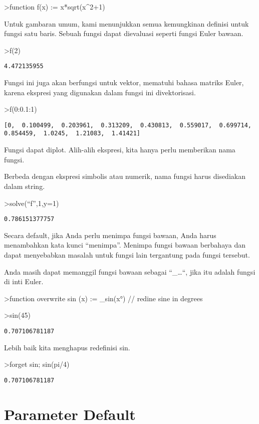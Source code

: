 \documentclass[
]{book}
\begin{document}
\textgreater function f(x) := x*sqrt(x\^{}2+1)

Untuk gambaran umum, kami menunjukkan semua kemungkinan definisi untuk fungsi satu baris. Sebuah fungsi dapat dievaluasi seperti fungsi Euler bawaan.

\textgreater f(2)

\begin{verbatim}
4.472135955
\end{verbatim}

Fungsi ini juga akan berfungsi untuk vektor, mematuhi bahasa matriks Euler, karena ekspresi yang digunakan dalam fungsi ini divektorisasi.

\textgreater f(0:0.1:1)

\begin{verbatim}
[0,  0.100499,  0.203961,  0.313209,  0.430813,  0.559017,  0.699714,
0.854459,  1.0245,  1.21083,  1.41421]
\end{verbatim}

Fungsi dapat diplot. Alih-alih ekspresi, kita hanya perlu memberikan nama fungsi.

Berbeda dengan ekspresi simbolis atau numerik, nama fungsi harus disediakan dalam string.

\textgreater solve(``f'',1,y=1)

\begin{verbatim}
0.786151377757
\end{verbatim}

Secara default, jika Anda perlu menimpa fungsi bawaan, Anda harus menambahkan kata kunci ``menimpa''. Menimpa fungsi bawaan berbahaya dan dapat menyebabkan masalah untuk fungsi lain tergantung pada fungsi tersebut.

Anda masih dapat memanggil fungsi bawaan sebagai ``\_\ldots``, jika itu adalah fungsi di inti Euler.

\textgreater function overwrite sin (x) := \_sin(x°) // redine sine in degrees

\textgreater sin(45)

\begin{verbatim}
0.707106781187
\end{verbatim}

Lebih baik kita menghapus redefinisi sin.

\textgreater forget sin; sin(pi/4)

\begin{verbatim}
0.707106781187
\end{verbatim}

\section{Parameter Default}\label{parameter-default}
\end{document}
